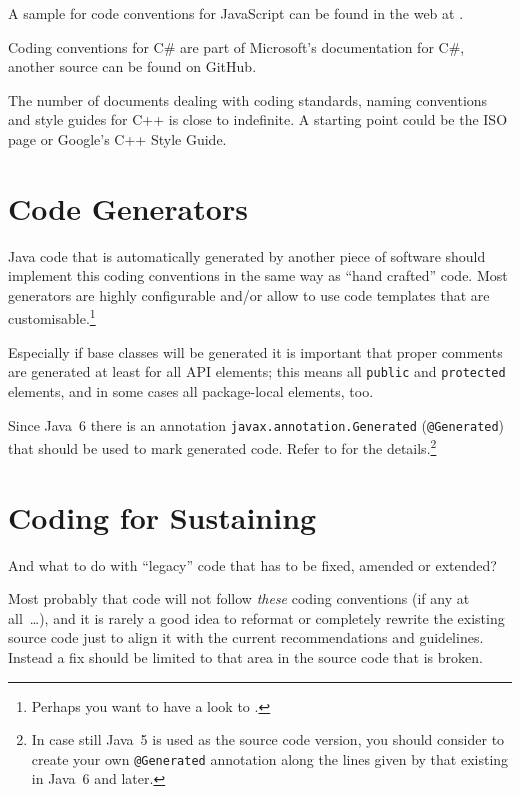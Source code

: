 \documentclass[11pt,a4paper, titlepage, parskip=half, headsepline, footsepline, cleardoublepage=current, headheight=1cm]{scrbook}
\begin{document}
A sample for code conventions for JavaScript can be found in the web at \autocite{Crockford:JAVASCRIPT_CODE_CONVENTIONS}.

Coding conventions for C\# are part of Microsoft's documentation for C\#\autocite{MICROSOFT:CsharpDocumentation}, another source can be found on GitHub\autocite{Taranov:CsharpCodingStandards}.

The number of documents dealing with coding standards, naming conventions and style guides for C++ is close to indefinite. A starting point could be the ISO page\autocite{ISO:CppCodingStandards} or Google's C++ Style Guide\autocite{Google:CppStyleGuide}.

\section{Code Generators}
Java code that is automatically generated by another piece of software should implement this coding conventions in the same way as “hand crafted” code. Most generators are highly configurable and/or allow to use code templates that are customisable.\footnote{Perhaps you want to have a look to \autocite{TQUADRAT_ORG_FOUNDATION_JAVACOMPOSER}.}

Especially if base classes will be generated it is important that proper comments are generated at least for all API elements; this means all \lstinline|public| and \lstinline|protected| elements, and in some cases all package-local elements, too.

Since Java~6 there is an annotation \lstinline|javax.annotation.Generated| (\lstinline|@Generated|) that should be used to mark generated code. Refer to \autocite{ORACLE_DOC_GENERATED_ANNOTATION} for the details.\footnote{In case still Java~5 is used as the source code version, you should consider to create your own \lstinline|@Generated| annotation along the lines given by that existing in Java~6 and later.}

\section{Coding for Sustaining}\label{sec:CodingForSustaining}
And what to do with “legacy” code that has to be fixed, amended or extended? 

Most probably that code will not follow \textit{these} coding conventions (if any at all~…), and it is rarely a good idea to reformat or completely rewrite the existing source code just to align it with the current recommendations and guidelines. Instead a fix should be limited to that area in the source code that is broken.
\end{document}
